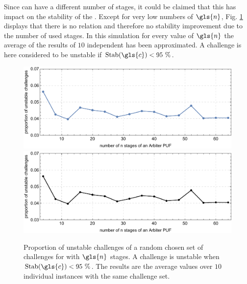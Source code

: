 Since \apufs can have a different number of stages, it could be claimed that this has impact on the stability of the \puf.
Except for very low numbers of $\gls{n}$, Fig. \ref{fig:arbiterstabilities} displays that there is no relation and therefore no stability improvement due to the number of used stages. %
In this simulation for every value of $\gls{n}$ the average of the results of $10$ independent \apufs has been approximated.
A challenge is here considered to be unstable if $\Stab(\gls{c}) < 95\ \%$.


\begin{figure}[ht]
\ifx{}\undefined
{}
\else
	\if{}
\centering
\includegraphics[width=1.00\textwidth]{images/stages-stab-simulation.pdf}
	\else
\includegraphics[width=1.00\textwidth]{images/stages-stab-simulation_mono.pdf}
    \fi
\fi
\caption[Proportion of unstable challenges of an \apuf]{Proportion of unstable challenges of a random chosen set of challenges for \apufs with $\gls{n}$ stages. 
A challenge is unstable when $\Stab(\gls{c}) < 95\ \%$. 
The results are the average values over $10$ individual \puf instances with the same challenge set.} 
\label{fig:arbiterstabilities}
\end{figure}


